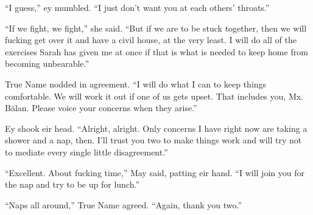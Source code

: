 ``I guess,'' ey mumbled. ``I just don't want you at each others' throats.''

``If we fight, we fight,'' she said. ``But if we are to be stuck together, then we will fucking get over it and have a civil house, at the very least. I will do all of the exercises Sarah has given me at once if that is what is needed to keep home from becoming unbearable.''

True Name nodded in agreement. ``I will do what I can to keep things comfortable. We will work it out if one of us gets upset. That includes you, Mx. Bălan. Please voice your concerns when they arise.''

Ey shook eir head. ``Alright, alright. Only concerns I have right now are taking a shower and a nap, then. I'll trust you two to make things work and will try not to mediate every single little disagreement.''

``Excellent. About fucking time,'' May said, patting eir hand. ``I will join you for the nap and try to be up for lunch.''

``Naps all around,'' True Name agreed. ``Again, thank you two.''
